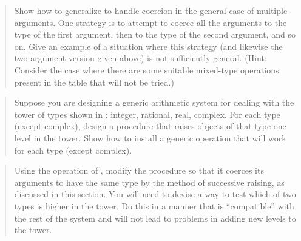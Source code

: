 \begin{quote}
 Show how to generalize
 to handle coercion in the general case of multiple
arguments.  One strategy is to attempt to coerce all the arguments to the type
of the first argument, then to the type of the second argument, and so on.
Give an example of a situation where this strategy (and likewise the
two-argument version given above) is not sufficiently general.  (Hint: Consider
the case where there are some suitable mixed-type operations present in the
table that will not be tried.)
\end{quote}

\begin{quote}
 Suppose you are designing a
generic arithmetic system for dealing with the tower of types shown in
: integer, rational, real, complex.  For each type (except
complex), design a procedure that raises objects of that type one level in the
tower.  Show how to install a generic  operation that will work for
each type (except complex).
\end{quote}

\begin{quote}
 Using the  operation
of , modify the  procedure so that it
coerces its arguments to have the same type by the method of successive
raising, as discussed in this section.  You will need to devise a way to test
which of two types is higher in the tower.  Do this in a manner that is
``compatible'' with the rest of the system and will not lead to problems in
adding new levels to the tower.
\end{quote}

